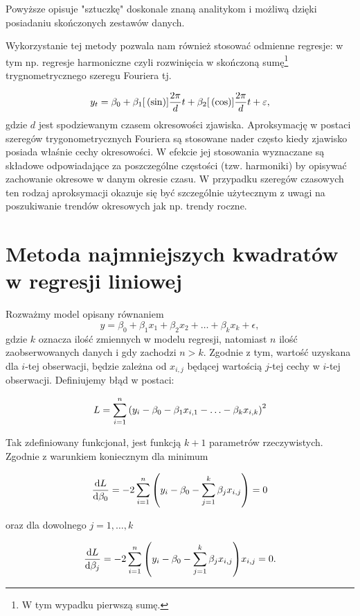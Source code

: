 \documentclass[10pt,a4paper]{book}
\begin{document}
Powyższe opisuje "sztuczkę" doskonale znaną analitykom i możliwą dzięki posiadaniu skończonych zestawów danych.

Wykorzystanie tej metody pozwala nam również stosować odmienne regresje: w tym np. regresje harmoniczne czyli rozwinięcia w skończoną sumę\footnote{W tym wypadku pierwszą sumę.} trygnometrycznego szeregu Fouriera tj.

\begin{equation}
y_t = \beta_0 + \beta_1 {{[}\left( {\sin} \right)}]{\frac{2 \pi}{d} t}  + \beta_2 {{[}\left( {\cos} \right)}]{\frac{2 \pi}{d} t} + \varepsilon,
\end{equation}
gdzie $d$ jest spodziewanym czasem okresowości zjawiska. Aproksymację w postaci szeregów trygonometrycznych Fouriera są stosowane nader często kiedy zjawisko posiada właśnie cechy okresowości. W efekcie jej stosowania wyznaczane są składowe odpowiadające za poszczególne częstości (tzw. harmoniki) by opisywać zachowanie okresowe w danym okresie czasu. W przypadku szeregów czasowych ten rodzaj aproksymacji okazuje się być szczególnie użytecznym z uwagi na poszukiwanie trendów okresowych jak np. trendy roczne.

\section{Metoda najmniejszych kwadratów w regresji liniowej}

Rozważmy model opisany równaniem 
$$
y = \beta_0 + \beta_1 x_1 + \beta_2 x_2 + \ldots + \beta_k x_k + \epsilon,
$$
gdzie $k$ oznacza ilość zmiennych w modelu regresji, natomiast $n$ ilość zaobserwowanych danych i gdy zachodzi $n > k$. Zgodnie z tym, wartość uzyskana dla $i$-tej obserwacji, będzie zależna od $x_{i,j}$ będącej wartością $j$-tej cechy w $i$-tej obserwacji. Definiujemy błąd w postaci:

$$
L = \sum_{i=1}^{n} \bracket{y_i - \beta_0 - \beta_1 x_{i,1} - \ldots - \beta_k x_{i,k}}^2
$$

Tak zdefiniowany funkcjonał, jest funkcją $k+1$ parametrów rzeczywistych. Zgodnie z warunkiem koniecznym dla minimum

$$
\ddx[{L}]{\beta_0} = -2 \sum_{i=1}^{n} \bracket{y_i - \beta_0 - \sum_{j=1}^{k} \beta_j x_{i,j}} = 0
$$

oraz dla dowolnego $j = 1, \ldots, k$

$$
\ddx[{L}]{\beta_j} = -2 \sum_{i=1}^{n} \bracket{y_i - \beta_0 - \sum_{j=1}^{k} \beta_j x_{i,j}} x_{i,j} = 0 .
$$
\end{document}
